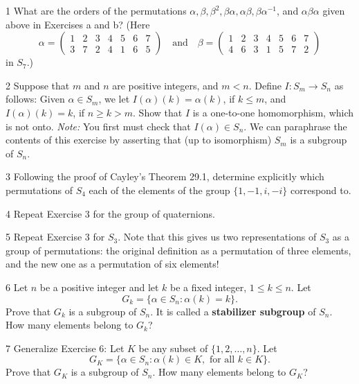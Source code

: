 \begin{problem}{1}
    What are the orders of the permutations
    $\alpha, \beta, \beta^2, \beta\alpha, \alpha\beta, \beta\alpha^{-1}$, and
    $\alpha\beta\alpha$ given above in Exercises a and b? (Here
    \[\alpha = \begin{pmatrix} 1 & 2 & 3 & 4 & 5 & 6 & 7 \\ 3 & 7 & 2 & 4 & 1 & 6 & 5 \end{pmatrix}
    \quad\text{and}\quad
    \beta = \begin{pmatrix} 1 & 2 & 3 & 4 & 5 & 6 & 7 \\ 4 & 6 & 3 & 1 & 5 & 7 & 2 \end{pmatrix}
    \]
    in $S_7$.)
\end{problem}
\unsolved

\begin{problem}{2}
    Suppose that $m$ and $n$ are positive integers, and $m < n$. Define
    $I : S_m \to S_n$ as follows: Given $\alpha \in S_m$, we let $I(\alpha)(k) = \alpha(k)$,
    if $k \le m$, and $I(\alpha)(k) = k$, if $n \ge k > m$. Show that $I$ is a one-to-one
    homomorphism, which is not onto. \emph{Note:} You first must check that
    $I(\alpha) \in S_n$. We can paraphrase the contents of this exercise by asserting that
    (up to isomorphism) $S_m$ is a subgroup of $S_n$.
\end{problem}
\unsolved

\begin{problem}{3}
    Following the proof of Cayley's Theorem 29.1, determine explicitly which permutations
    of $S_4$ each of the elements of the group $\{1, -1, i, -i\}$ correspond to.
\end{problem}
\unsolved

\begin{problem}{4}
    Repeat Exercise 3 for the group of quaternions.
\end{problem}
\unsolved

\begin{problem}{5}
    Repeat Exercise 3 for $S_3$. Note that this gives us two representations of $S_3$ as a
    group of permutations: the original definition as a permutation of three elements, and
    the new one as a permutation of six elements!
\end{problem}
\unsolved

\begin{problem}{6}
    Let $n$ be a positive integer and let $k$ be a fixed integer, $1 \le k \le n$. Let
    \[G_k = \{\alpha \in S_n : \alpha(k) = k\}.\]
    Prove that $G_k$ is a subgroup of $S_n$. It is called a \textbf{stabilizer subgroup}
    of $S_n$. How many elements belong to $G_k$?
\end{problem}
\unsolved

\begin{problem}{7}
    Generalize Exercise 6: Let $K$ be any subset of $\{1, 2, \ldots, n\}$. Let
    \[G_K = \{\alpha \in S_n : \alpha(k) \in K, \text{ for all } k \in K\}.\]
    Prove that $G_K$ is a subgroup of $S_n$. How many elements belong to $G_K$?
\end{problem}
\unsolved
